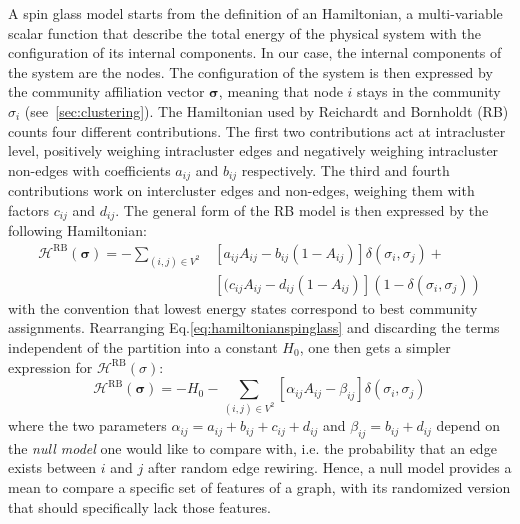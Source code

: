 A spin glass model starts from the definition of an Hamiltonian, a multi-variable scalar function that describe the total energy of the physical system with the configuration of its internal components. In our case, the internal components of the system are the nodes. The configuration of the system is then expressed by the community affiliation vector $\boldsymbol\sigma$, meaning that node $i$ stays in the community $\sigma_i$ (see~\ref{sec:clustering}).
The Hamiltonian used by Reichardt and Bornholdt (RB) counts four different contributions. The first two contributions act at intracluster level, positively weighing intracluster edges and negatively weighing intracluster non-edges with coefficients $a_{ij}$ and $b_{ij}$ respectively. The third and fourth contributions work on intercluster edges and non-edges, weighing them with factors $c_{ij}$ and $d_{ij}$. The general form of the RB model is then expressed by the following Hamiltonian:
\begin{align}\label{eq:hamiltonianspinglass}
\mathcal{H}^{\textrm{RB}}(\boldsymbol \sigma) = - \sum_{(i,j)\in V^2} & \left[ a_{ij} A_{ij} - b_{ij}(1-A_{ij}) \right] \delta(\sigma_i,\sigma_j) + \nonumber \\ &  \left[ (c_{ij} A_{ij} - d_{ij}(1-A_{ij}) \right] (1-\delta(\sigma_i,\sigma_j))
\end{align}
with the convention that lowest energy states correspond to best community assignments.
Rearranging Eq.\ref{eq:hamiltonianspinglass} and discarding the terms independent of the partition into a constant $H_0$, one then gets a simpler expression for $\mathcal{H}^{\textrm{RB}}(\sigma)$:
\begin{equation}\label{eq:rbspinglass}
\mathcal{H}^{\textrm{RB}}(\boldsymbol \sigma) = -H_0 - \sum \limits_{(i,j)\in V^2} \left[ \alpha_{ij} A_{ij} - \beta_{ij} \right] \delta(\sigma_i,\sigma_j)
\end{equation}
where the two parameters $\alpha_{ij}=a_{ij}+b_{ij}+c_{ij}+d_{ij}$ and $\beta_{ij}=b_{ij}+d_{ij}$ depend on the \emph{null model} one would like to compare with, i.e. the probability that an edge exists between $i$ and $j$ after random edge rewiring. Hence, a null model provides a mean to compare a specific set of features of a graph, with its randomized version that should specifically lack those features.


